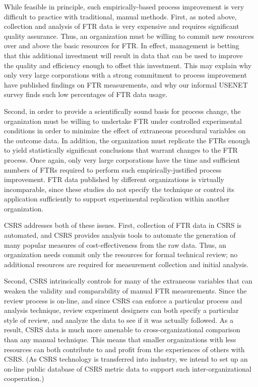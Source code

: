 While feasible in principle, such empirically-based process improvement is
very difficult to practice with traditional, manual methods.  First, as
noted above, collection and analysis of FTR data is very expensive and
requires significant quality assurance.  Thus, an organization must
be willing to commit new resources over and above the basic resources for
FTR.  In effect, management is betting that this additional investment will
result in data that can be used to improve the quality and efficiency
enough to offset this investment.  This may explain why only very large
corporations with a strong commitment to process improvement have published
findings on FTR measurements, and why our informal USENET survey finds such
low percentages of FTR data usage.

Second, in order to provide a scientifically sound basis for process
change, the organization must be willing to undertake FTR under controlled
experimental conditions in order to minimize the effect of extraneous
procedural variables on the outcome data. In addition, the organization
must replicate the FTRs enough to yield statistically significant
conclusions that warrant changes to the FTR process.  Once again, only very
large corporations have the time and sufficient numbers of FTRs required to
perform such empirically-justified process improvement.  FTR data published
by different organizations is virtually incomparable, since these studies
do not specify the technique or control its application sufficiently to
support experimental replication within another organization.

CSRS addresses both of these issues.  First, collection of FTR data in CSRS
is automated, and CSRS provides analysis tools to automate the generation
of many popular measures of cost-effectiveness from the raw data.  Thus, an
organization needs commit only the resources for formal technical review;
no additional resources are required for measurement collection and initial
analysis.

Second, CSRS intrinsically controls for many of the extraneous variables
that can weaken the validity and comparability of manual FTR measurements.
Since the review process is on-line, and since CSRS can enforce a
particular process and analysis technique, review experiment designers can
both specify a particular style of review, and analyze the data to see if
it was actually followed.  As a result, CSRS data is much more amenable to
cross-organizational comparison than any manual technique.  This means that
smaller organizations with less resources can both contribute to and profit
from the experiences of others with CSRS.  (As CSRS technology is
transferred into industry, we intend to set up an on-line public database
of CSRS metric data to support such inter-organizational cooperation.)

